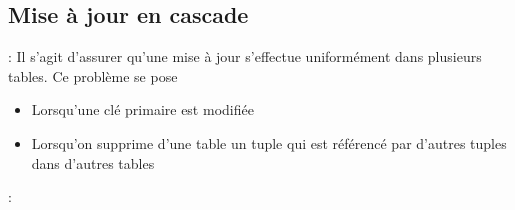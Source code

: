 \documentclass[10pt]{beamer}
\begin{document}
\subsection{Mise à jour en cascade}
\begin{frame}{\secname : \subsecname}
    Il s'agit d'assurer qu'une mise à jour s'effectue uniformément dans plusieurs tables.
    Ce problème se pose
    \begin{itemize}
        \item  Lorsqu'une clé primaire est modifiée
        \item Lorsqu'on supprime d'une table un tuple qui est référencé par d'autres tuples dans d'autres tables
    \end{itemize}
\end{frame}

\begin{frame}{\secname : \subsecname}
    
\end{frame}
\end{document}
